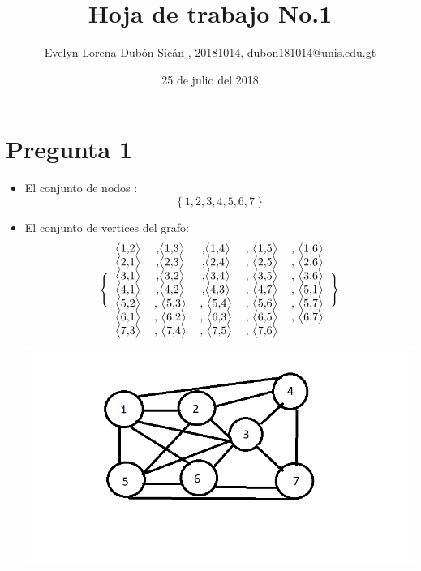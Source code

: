 \documentclass{article}
\author{Evelyn Lorena Dubón Sicán , 20181014, dubon181014@unis.edu.gt}
\title{Hoja de trabajo No.1}
\date{25 de julio del 2018}
\begin{document}
\maketitle

\section{Pregunta 1}
\begin{itemize}
    \item El conjunto de nodos : \[ 
\left \{
  1, 2, 3, 4, 5, 6, 7
\right \}
\]
    \item  El conjunto de vertices del grafo:\[ 
\Bigg \{
  \begin{tabular}{cccccc}
\big\langle1,2\big\rangle &,\big\langle1,3\big\rangle &,\big\langle1,4\big\rangle &, \big\langle1,5\big\rangle &, \big\langle1,6\big\rangle \\
\big\langle2,1\big\rangle &,\big\langle2,3\big\rangle &,\big\langle2,4\big\rangle &, \big\langle2,5\big\rangle &, \big\langle2,6\big\rangle \\
\big\langle3,1\big\rangle &,\big\langle3,2\big\rangle &,\big\langle3,4\big\rangle &, \big\langle3,5\big\rangle &, \big\langle3,6\big\rangle \\
\big\langle4,1\big\rangle &,\big\langle4,2\big\rangle &,\big\langle4,3\big\rangle &, \big\langle4,7\big\rangle &, \big\langle5,1\big\rangle \\
\big\langle5,2\big\rangle &, \big\langle5,3\big\rangle &, \big\langle5,4\big\rangle &, \big\langle5,6\big\rangle &, \big\langle5,7\big\rangle \\
\big\langle6,1\big\rangle &, \big\langle6,2\big\rangle &, \big\langle6,3\big\rangle &, \big\langle6,5\big\rangle &, \big\langle6,7\big\rangle \\
\big\langle7,3\big\rangle &, \big\langle7,4\big\rangle &, \big\langle7,5\big\rangle &, \big\langle7,6\big\rangle
  \end{tabular}
  \Bigg \}
\] 
\center \includegraphics{Grafo.png}    
\end{itemize}
\end{document}
